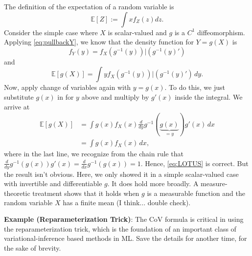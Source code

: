 \documentclass{book}
\newcommand{\dx}{\, dx}
\newcommand{\dy}{\, dy}
\newcommand{\E}{\mathbb{E}}
\begin{document}
The definition of the expectation of a random variable is
$$
\E[Z] := \int x f_Z(z) dz. 
$$
Consider the simple case where $X$ is scalar-valued and $g$ is a $C^1$ diffeomorphism. Applying \eqref{eq:pullbackY}, we know that the density function for $Y = g(X)$ is
$$
f_Y(y) = f_X(g^{-1}(y)) |(g^{-1}(y)')
$$
and 
$$
\E[g(X)] = \int y f_X(g^{-1}(y)) |(g^{-1}(y)') \dy. 
$$
Now, apply change of variables again with $y = g(x)$. To do this, we just substitute $g(x)$ in for $y$ above and multiply by $g'(x)$ inside the integral. We arrive at
\begin{align}
\E[g(X)] & = \int g(x) f_X(x) \frac{d}{dy} g^{-1}(\underbrace{g(x)}_{=y}) g'(x) \dx\\
& = \int g(x) f_X(x) \dx,
\end{align}
where in the last line, we recognize from the chain rule that $\frac{d}{dy} g^{-1}(g(x)) g'(x)  = \frac{d}{dx} g^{-1}(g(x)) = 1$. 
Hence, \eqref{eq:LOTUS} is correct. But the result isn't obvious. Here, we only showed it in a simple scalar-valued case with invertible and differentiable $g$. It does hold more broadly. A measure-theoretic treatment shows that it holds when $g$ is a measurable function and the random variable $X$ has a finite mean (I think... double check). 

\vspace{1em} \noindent
\textbf{Example (Reparameterization Trick)}: The CoV formula is critical in using the reparameterization trick, which is the foundation of an important class of variational-inference based methods in ML. Save the details for another time, for the sake of brevity. 
\end{document}
